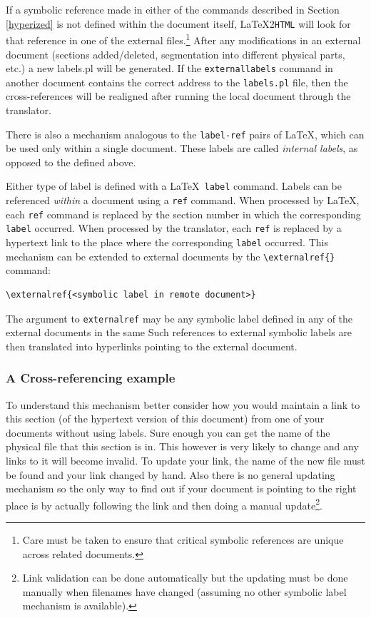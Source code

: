 \documentclass[dvips]{article}
\newcommand{\latextohtml}{\LaTeX 2\texttt{HTML}}
\newcommand{\fn}[1]{{\ttfamily #1}}	%
\begin{document}
\begin{changebar}
If a symbolic reference made in either of the commands described in
Section \ref{hyperized} is not defined within the document itself,
\latextohtml{} will look for that reference in one of the external
files.\footnote{Care must be taken to ensure that critical symbolic
references are unique across related documents.}
After any modifications in an external document (sections added/deleted,
segmentation into different physical parts, etc.) a new \fn{labels.pl}
will be generated.  If the \texttt{externallabels} command in another 
document contains the correct address
to the \texttt{labels.pl} file, then the cross-references will be realigned
after running the local document through the translator.

There is also a mechanism analogous to the
\texttt{label-ref} pairs of \LaTeX, which can be used only 
within a single document. These labels are called
\textit{internal labels}\label{internallabels},
as opposed to the  defined above.

Either type of label is defined with a \LaTeX\ 
\texttt{label} command.  Labels can be referenced \textit{within}
a document using a \texttt{ref} command.
When processed by \LaTeX, each \texttt{ref} command is replaced by the 
section number in which the corresponding \texttt{label} occurred.
When processed by the translator, each \texttt{ref} is replaced by 
a hypertext link to the place where the corresponding \texttt{label}
occurred.  This mechanism can be extended to external documents
by the \verb|\externalref{}| command:

\begin{verbatim}
\externalref{<symbolic label in remote document>}
\end{verbatim}

The argument to \texttt{externalref} may be any symbolic label defined 
in any of the external documents in the same
Such references to external symbolic labels are then translated
into hyperlinks pointing to the external document.
\end{changebar}

\subsubsection{A Cross-referencing example}
\label{crossrefs} 
To understand this mechanism better consider 
how you would maintain a link to this section  
(of the hypertext version of this document) from one of your documents
without using labels.
Sure enough you can get the
name of the physical file that this section is in. This however is very
likely to change and any links to it will become invalid. To update 
your link, the name of the new file must be found and your link changed 
by hand. Also there is no general updating mechanism so the only way to
find
out if your document is pointing to the right place is by actually
following the link and then doing a manual update\footnote{
Link validation can be done automatically but the updating must be
done
manually when filenames have changed (assuming no other symbolic label
mechanism is available).}.
\end{document}
